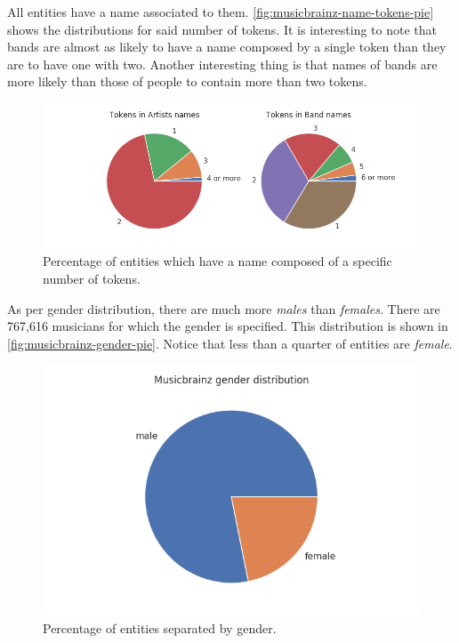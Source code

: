 \documentclass[epsfig,a4paper,11pt,titlepage,twoside,openany]{book}
\begin{document}
All entities have a name associated to them. \autoref{fig:musicbrainz-name-tokens-pie} shows the distributions for said number of tokens. It is interesting to note that bands are almost as likely to have a name composed by a single token than they are to have one with two. Another interesting thing is that names of bands are more likely than those of people to contain more than two tokens.

\begin{figure}[]
  \centering \includegraphics[width=\textwidth]{musicbrainz_token_names_entities} 
  \caption{Percentage of entities which have a name composed of a specific number of tokens.}
  \label{fig:musicbrainz-name-tokens-pie}
\end{figure}

As per gender distribution, there are much more \textit{males} than \textit{females}. There are 767,616 musicians for which the gender is specified. This distribution is shown in \autoref{fig:musicbrainz-gender-pie}. Notice that less than a quarter of entities are \textit{female}.

\begin{figure}[]
  \centering \includegraphics[width=.8\textwidth]{musicbrainz_gender_pieplot} 
  \caption{Percentage of entities separated by gender.}
  \label{fig:musicbrainz-gender-pie}
\end{figure}
\end{document}
